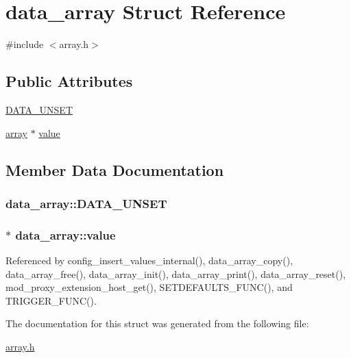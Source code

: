 \hypertarget{structdata__array}{\section{data\-\_\-array Struct Reference}
\label{structdata__array}
}


{\ttfamily \#include $<$array.\-h$>$}

\subsection*{Public Attributes}
\begin{DoxyCompactItemize}
\item 
\hyperlink{structdata__array_a44d6978f913955958de5224db7c26519}{D\-A\-T\-A\-\_\-\-U\-N\-S\-E\-T}
\item 
\hyperlink{structarray}{array} $\ast$ \hyperlink{structdata__array_a911217b149a344fdf101183b38e657a2}{value}
\end{DoxyCompactItemize}


\subsection{Member Data Documentation}
\hypertarget{structdata__array_a44d6978f913955958de5224db7c26519}{
\subsubsection[{D\-A\-T\-A\-\_\-\-U\-N\-S\-E\-T}]{\setlength{\rightskip}{0pt plus 5cm}data\-\_\-array\-::\-D\-A\-T\-A\-\_\-\-U\-N\-S\-E\-T}}\label{structdata__array_a44d6978f913955958de5224db7c26519}
\hypertarget{structdata__array_a911217b149a344fdf101183b38e657a2}{
\subsubsection[{value}]{$\ast$ data\-\_\-array\-::value}}\label{structdata__array_a911217b149a344fdf101183b38e657a2}


Referenced by config\-\_\-insert\-\_\-values\-\_\-internal(), data\-\_\-array\-\_\-copy(), data\-\_\-array\-\_\-free(), data\-\_\-array\-\_\-init(), data\-\_\-array\-\_\-print(), data\-\_\-array\-\_\-reset(), mod\-\_\-proxy\-\_\-extension\-\_\-host\-\_\-get(), S\-E\-T\-D\-E\-F\-A\-U\-L\-T\-S\-\_\-\-F\-U\-N\-C(), and T\-R\-I\-G\-G\-E\-R\-\_\-\-F\-U\-N\-C().



The documentation for this struct was generated from the following file\-:\begin{DoxyCompactItemize}
\item 
\hyperlink{array_8h}{array.\-h}\end{DoxyCompactItemize}

